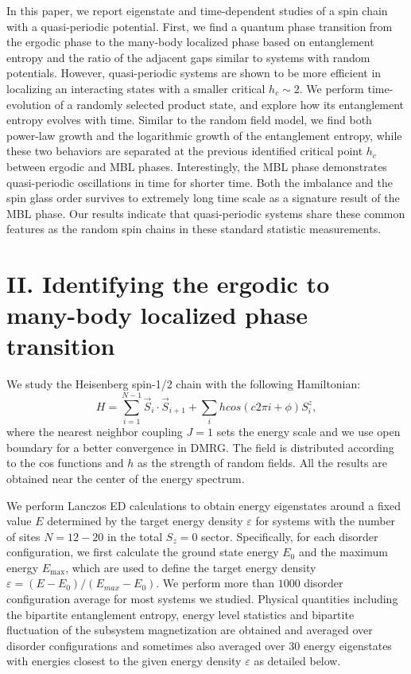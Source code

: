 \documentclass[prl,aps,epsf,showpacs,twocolumn]{revtex4}
\begin{document}
In this paper, we report  eigenstate and  time-dependent studies of a spin chain with a quasi-periodic potential.
First, we find a  quantum phase transition from the ergodic phase to the many-body localized phase based on
entanglement entropy and the ratio of the adjacent gaps similar to systems with random potentials. However, quasi-periodic
systems are shown to be more efficient in localizing an interacting states with a smaller critical $h_c \sim 2$.     
We perform time-evolution of a randomly selected  product state, and explore how its entanglement entropy
evolves with time.  Similar to the random field model, we find both power-law  growth and the logarithmic growth
of the entanglement entropy,  while these two  behaviors are separated at the previous identified critical point
$h_c$ between ergodic and MBL phases.   Interestingly,  the MBL phase demonstrates quasi-periodic oscillations
in time for shorter time.  Both the imbalance and the spin glass order survives to extremely long time scale
as a signature result of the MBL phase.   Our results indicate that quasi-periodic systems share these common
features as the random spin chains in these standard statistic measurements. 



\section{II.  Identifying the ergodic to many-body localized phase transition}

We  study  the Heisenberg  spin-1/2 chain   
with  the following Hamiltonian:
\begin{equation}
 H =  \sum_{i=1}^{N-1} \vec{S}_i \cdot \vec{S}_{i+1}
  + \sum_{i} hcos(c2\pi i+\phi) S_i^z,\nonumber
\end{equation}
where the nearest neighbor  
 coupling  $J=1$  sets   the 
energy scale  and we use open boundary for a  better convergence  in DMRG.
The field  is distributed according to the cos functions and 
$h$ as the strength of  random fields.
All the results are obtained near  the center of the energy spectrum.


We  perform Lanczos ED calculations     to obtain  energy eigenstates around a fixed value
$E$ determined by the target  energy density $\varepsilon$ for  systems with the number of sites
$N=12-20$  in the total $S_z=0$ sector.
Specifically, for each disorder configuration, we first calculate the
ground state energy  $E_0$ and the maximum energy $E_\text{max}$, which are  used to define the target
energy density $\varepsilon = (E-E_0)/(E_{max} -E_0)$.
We perform more than $1000$ disorder configuration average for most  systems we studied.
Physical quantities\cite{luitz2015}  including the bipartite entanglement entropy,  energy level statistics and
bipartite  fluctuation of the subsystem magnetization are obtained and averaged over
  disorder configurations and sometimes also averaged over  30 energy eigenstates with energies closest to the given
energy density $\varepsilon$ as detailed below.
\end{document}
